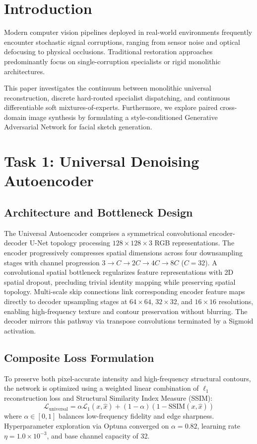 \documentclass[conference]{IEEEtran}
\begin{document}
\section{Introduction}
Modern computer vision pipelines deployed in real-world environments frequently encounter stochastic signal corruptions, ranging from sensor noise and optical defocusing to physical occlusions. Traditional restoration approaches predominantly focus on single-corruption specialists or rigid monolithic architectures. 

This paper investigates the continuum between monolithic universal reconstruction, discrete hard-routed specialist dispatching, and continuous differentiable soft mixtures-of-experts. Furthermore, we explore paired cross-domain image synthesis by formulating a style-conditioned Generative Adversarial Network for facial sketch generation.

\section{Task 1: Universal Denoising Autoencoder}
\subsection{Architecture and Bottleneck Design}
The Universal Autoencoder comprises a symmetrical convolutional encoder-decoder U-Net topology processing $128 \times 128 \times 3$ RGB representations. The encoder progressively compresses spatial dimensions across four downsampling stages with channel progression $3 \to C \to 2C \to 4C \to 8C$ ($C=32$). A convolutional spatial bottleneck regularizes feature representations with 2D spatial dropout, precluding trivial identity mapping while preserving spatial topology. Multi-scale skip connections link corresponding encoder feature maps directly to decoder upsampling stages at $64\times 64$, $32\times 32$, and $16\times 16$ resolutions, enabling high-frequency texture and contour preservation without blurring. The decoder mirrors this pathway via transpose convolutions terminated by a Sigmoid activation.

\subsection{Composite Loss Formulation}
To preserve both pixel-accurate intensity and high-frequency structural contours, the network is optimized using a weighted linear combination of $\ell_1$ reconstruction loss and Structural Similarity Index Measure (SSIM):
\begin{equation}
\mathcal{L}_{\text{universal}} = \alpha \mathcal{L}_1(x, \hat{x}) + (1 - \alpha)(1 - \text{SSIM}(x, \hat{x}))
\end{equation}
where $\alpha \in [0, 1]$ balances low-frequency fidelity and edge sharpness. Hyperparameter exploration via Optuna converged on $\alpha = 0.82$, learning rate $\eta = 1.0 \times 10^{-3}$, and base channel capacity of 32.
\end{document}
